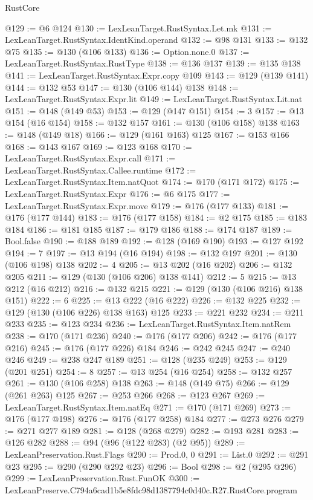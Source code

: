 \begin{lexlean}{RustCore}
\begin{coremodule}
@129 := @6 @124
@130 := LexLeanTarget.RustSyntax.Let.mk
@131 := LexLeanTarget.RustSyntax.IdentKind.operand
@132 := @98 @131
@133 := @132 @75
@135 := @130 (@106 @133)
@136 := Option.none.{0}
@137 := LexLeanTarget.RustSyntax.RustType
@138 := @136 @137
@139 := @135 @138
@141 := LexLeanTarget.RustSyntax.Expr.copy @109
@143 := @129 (@139 @141)
@144 := @132 @53
@147 := @130 (@106 @144) @138
@148 := LexLeanTarget.RustSyntax.Expr.lit
@149 := LexLeanTarget.RustSyntax.Lit.nat
@151 := @148 (@149 @53)
@153 := @129 (@147 @151)
@154 := 3
@157 := @13 @154 (@16 @154)
@158 := @132 @157
@161 := @130 (@106 @158) @138
@163 := @148 (@149 @18)
@166 := @129 (@161 @163) @125
@167 := @153 @166
@168 := @143 @167
@169 := @123 @168
@170 := LexLeanTarget.RustSyntax.Expr.call
@171 := LexLeanTarget.RustSyntax.Callee.runtime
@172 := LexLeanTarget.RustSyntax.Item.natQuot
@174 := @170 (@171 @172)
@175 := LexLeanTarget.RustSyntax.Expr
@176 := @6 @175
@177 := LexLeanTarget.RustSyntax.Expr.move
@179 := @176 (@177 @133)
@181 := @176 (@177 @144)
@183 := @176 (@177 @158)
@184 := @2 @175
@185 := @183 @184
@186 := @181 @185
@187 := @179 @186
@188 := @174 @187
@189 := Bool.false
@190 := @188 @189
@192 := @128 (@169 @190)
@193 := @127 @192
@194 := 7
@197 := @13 @194 (@16 @194)
@198 := @132 @197
@201 := @130 (@106 @198) @138
@202 := 4
@205 := @13 @202 (@16 @202)
@206 := @132 @205
@211 := @129 (@130 (@106 @206) @138 @141)
@212 := 5
@215 := @13 @212 (@16 @212)
@216 := @132 @215
@221 := @129 (@130 (@106 @216) @138 @151)
@222 := 6
@225 := @13 @222 (@16 @222)
@226 := @132 @225
@232 := @129 (@130 (@106 @226) @138 @163) @125
@233 := @221 @232
@234 := @211 @233
@235 := @123 @234
@236 := LexLeanTarget.RustSyntax.Item.natRem
@238 := @170 (@171 @236)
@240 := @176 (@177 @206)
@242 := @176 (@177 @216)
@245 := @176 (@177 @226) @184
@246 := @242 @245
@247 := @240 @246
@249 := @238 @247 @189
@251 := @128 (@235 @249)
@253 := @129 (@201 @251)
@254 := 8
@257 := @13 @254 (@16 @254)
@258 := @132 @257
@261 := @130 (@106 @258) @138
@263 := @148 (@149 @75)
@266 := @129 (@261 @263) @125
@267 := @253 @266
@268 := @123 @267
@269 := LexLeanTarget.RustSyntax.Item.natEq
@271 := @170 (@171 @269)
@273 := @176 (@177 @198)
@276 := @176 (@177 @258) @184
@277 := @273 @276
@279 := @271 @277 @189
@281 := @128 (@268 @279)
@282 := @193 @281
@283 := @126 @282
@288 := @94 (@96 (@122 @283) (@2 @95))
@289 := LexLeanPreservation.Rust.Flags
@290 := Prod.{0, 0}
@291 := List.{0}
@292 := @291 @23
@295 := @290 (@290 @292 @23)
@296 := Bool
@298 := @2 (@295 @296)
@299 := LexLeanPreservation.Rust.FunOK
@300 := LexLeanPreserve.C794a6cad1b5e8fdc98d1387794c0d40c.R27.RustCore.program

\end{coremodule}
\end{lexlean}
